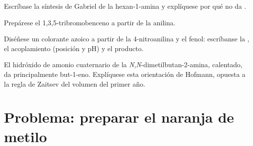 \begin{exercise}[$\star\star$]\label{exo:b2:amines:9}
Escríbase la síntesis de Gabriel de la hexan-1-amina y explíquese por qué no da .
\end{exercise}

\begin{exercise}[$\star\star\star$]\label{exo:b2:amines:10}
Prepárese el 1,3,5-tribromobenceno a partir de la anilina.
\end{exercise}

\begin{exercise}[$\star\star\star$]\label{exo:b2:amines:11}
Diséñese un colorante azoico a partir de la 4-nitroanilina y el fenol: escríbanse la , el acoplamiento (posición
y pH) y el producto.
\end{exercise}

\begin{exercise}[$\star\star\star$]\label{exo:b2:amines:12}
El hidróxido de amonio cuaternario de la \textit{N},\textit{N}-dimetilbutan-2-amina, calentado, da
principalmente but-1-eno. Explíquese esta orientación de Hofmann, opuesta a la regla de Zaitsev del volumen
del primer año.
\end{exercise}

\section{Problema: preparar el naranja de metilo}

